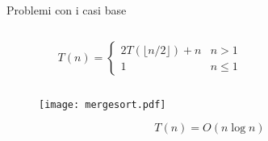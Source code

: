 



\begin{frame}{Problemi con i casi base}

\vspace{-6pt}
\begin{mybox}
\begin{columns}[c]
\begin{column}{0.48\textwidth}
\[
T(n) = \begin{cases}
      2T( \lfloor n/2 \rfloor )  + n & n > 1 \\
     1 & n \leq 1
  \end{cases}
\]
\end{column}
\begin{column}{0.51\textwidth}
\end{column}
\end{columns}
\end{mybox}

\begin{overprint}
\begin{figure}
	\texttt{[image: mergesort.pdf]}
\end{figure}
\[
T(n) = O(n \log n)
\]
\end{overprint}

\end{frame}

